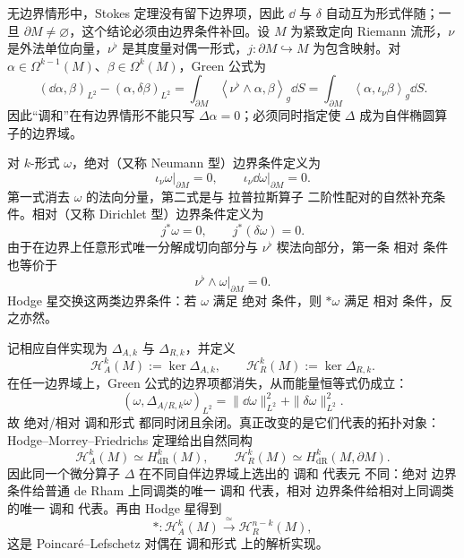 无边界情形中，Stokes 定理没有留下边界项，因此 $\dd$ 与 $\delta$ 自动互为形式伴随；一旦 $\partial M\neq\varnothing$，这个结论必须由边界条件补回。设 $M$ 为紧致定向 Riemann 流形，$\nu$ 是外法单位向量，$\nu^\flat$ 是其度量对偶一形式，$j:\partial M\hookrightarrow M$ 为包含映射。对 $\alpha\in\Omega^{k-1}(M)$、$\beta\in\Omega^k(M)$，Green 公式为
\begin{equation}\label{eq:math-dg-hodge-green-boundary}
 (\dd\alpha,\beta)_{L^2}-(\alpha,\delta\beta)_{L^2}
 =\int_{\partial M}
 \left\langle \nu^\flat\wedge\alpha,\beta\right\rangle_g\dd S
 =\int_{\partial M}
 \left\langle \alpha,\iota_{\nu}\beta\right\rangle_g\dd S.
\end{equation}
因此“调和”在有边界情形不能只写 $\Delta\alpha=0$；必须同时指定使 $\Delta$ 成为自伴椭圆算子的边界域。

对 $k$-形式 $\omega$，绝对（又称 Neumann 型）边界条件定义为
\begin{equation*}{
 \iota_{\nu}\omega\big|_{\partial M}=0,
 \qquad
 \iota_{\nu}\dd\omega\big|_{\partial M}=0.}
\end{equation*}
第一式消去 $\omega$ 的法向分量，第二式是与 拉普拉斯算子 二阶性配对的自然补充条件。相对（又称 Dirichlet 型）边界条件定义为
\begin{equation*}{
 j^*\omega=0,
 \qquad
 j^*(\delta\omega)=0.}
\end{equation*}
由于在边界上任意形式唯一分解成切向部分与 $\nu^\flat$ 楔法向部分，第一条 相对 条件也等价于
\[
 \nu^\flat\wedge\omega\big|_{\partial M}=0.
\]
Hodge 星交换这两类边界条件：若 $\omega$ 满足 绝对 条件，则 $*\omega$ 满足 相对 条件，反之亦然。

记相应自伴实现为 $\Delta_{A,k}$ 与 $\Delta_{R,k}$，并定义
\begin{equation*}\mathcal H_A^k(M):=\ker\Delta_{A,k},
 \qquad
 \mathcal H_R^k(M):=\ker\Delta_{R,k}.
\end{equation*}
在任一边界域上，Green 公式的边界项都消失，从而能量恒等式仍成立：
\begin{equation}\label{eq:math-dg-boundary-hodge-energy}
 (\omega,\Delta_{A/R,k}\omega)_{L^2}
 =\|\dd\omega\|_{L^2}^2+\|\delta\omega\|_{L^2}^2.
\end{equation}
故 绝对/相对 调和形式 都同时闭且余闭。真正改变的是它们代表的拓扑对象：Hodge--Morrey--Friedrichs 定理给出自然同构
\begin{equation*}{
 \mathcal H_A^k(M)\simeq H_{\mathrm{dR}}^k(M),
 \qquad
 \mathcal H_R^k(M)\simeq H_{\mathrm{dR}}^k(M,\partial M).}
\end{equation*}
因此同一个微分算子 $\Delta$ 在不同自伴边界域上选出的 调和 代表元 不同：绝对 边界条件给普通 de Rham 上同调类的唯一 调和 代表，相对 边界条件给相对上同调类的唯一 调和 代表。再由 Hodge 星得到
\begin{equation}\label{eq:math-dg-poincare-lefschetz-hodge}
 *:\mathcal H_A^k(M)\xrightarrow{\ \simeq\ }
 \mathcal H_R^{n-k}(M),
\end{equation}
这是 Poincar\'e--Lefschetz 对偶在 调和形式 上的解析实现。

